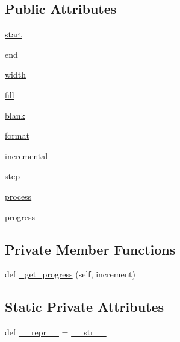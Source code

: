 \subsection*{Public Attributes}
\begin{DoxyCompactItemize}
\item 
\hyperlink{classprogressbar_1_1ProgressBar_a550afef3072c2412e2aa906b12c33bbe}{start}
\item 
\hyperlink{classprogressbar_1_1ProgressBar_a92053e3baab49364971c15373b6c848f}{end}
\item 
\hyperlink{classprogressbar_1_1ProgressBar_abde0c8da19e6e6bcde845b1eb3cee279}{width}
\item 
\hyperlink{classprogressbar_1_1ProgressBar_a6b11796a20118f92eb59abbccf626d23}{fill}
\item 
\hyperlink{classprogressbar_1_1ProgressBar_a0bfce2d34f0a8f034748d77cc5140bc5}{blank}
\item 
\hyperlink{classprogressbar_1_1ProgressBar_a4dd00a852851da809ffad5e1bf282858}{format}
\item 
\hyperlink{classprogressbar_1_1ProgressBar_a0b98b7a8f7025b78a5d01f0dcfc2dbaa}{incremental}
\item 
\hyperlink{classprogressbar_1_1ProgressBar_ac076ee00e3a70c69b8583668c165415a}{step}
\item 
\hyperlink{classprogressbar_1_1ProgressBar_a28ce54371f3a84172049c0520726d2aa}{process}
\item 
\hyperlink{classprogressbar_1_1ProgressBar_a3adc96f42e6891bcd2885c9ef29767f3}{progress}
\end{DoxyCompactItemize}
\subsection*{Private Member Functions}
\begin{DoxyCompactItemize}
\item 
def \hyperlink{classprogressbar_1_1ProgressBar_a8e8704c0f26d529f82413318cc9e9c81}{\+\_\+get\+\_\+progress} (self, increment)
\end{DoxyCompactItemize}
\subsection*{Static Private Attributes}
\begin{DoxyCompactItemize}
\item 
def \hyperlink{classprogressbar_1_1ProgressBar_a53eaadf85baa406c1f179fea7029d8b0}{\+\_\+\+\_\+repr\+\_\+\+\_\+} = \hyperlink{classprogressbar_1_1ProgressBar_aea02b9e37516e9d267e2d48b4e415bd8}{\+\_\+\+\_\+str\+\_\+\+\_\+}
\end{DoxyCompactItemize}


